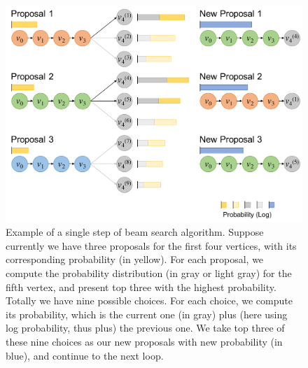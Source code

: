\begin{figure}[!h]
	\centering
	\includegraphics[width=\fig\textwidth]{3-19.pdf}
    \caption[Example of a single step of beam search algorithm]{Example of a single step of beam search algorithm. Suppose currently we have three proposals for the first four vertices, with its corresponding probability (in yellow). For each proposal, we compute the probability distribution (in gray or light gray) for the fifth vertex, and present top three with the highest probability. Totally we have nine possible choices. For each choice, we compute its probability, which is the current one (in gray) plus (here using log probability, thus plus) the previous one. We take top three of these nine choices as our new proposals with new probability (in blue), and continue to the next loop.}
	\label{fig:bmsrch}
\end{figure}

